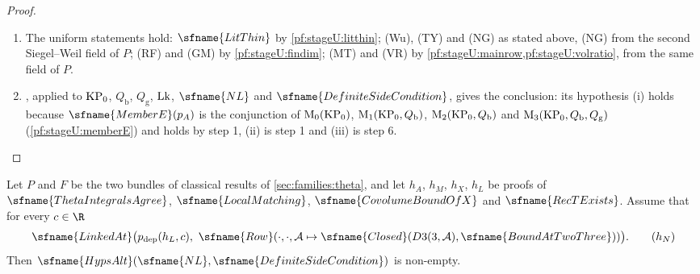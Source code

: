 \begin{proof}
\begin{enumerate}[label=\arabic*.]
linked for the covolume, functional and norm rows of $\stageUNN$ satisfies
$\sfname{AllRowsAlt}(\stageUKP_0,Q_{\mathrm b},Q_{\mathrm g},\stageULk,\stageUNN,\sfname{DefiniteSideCondition})$), applied with
the fields of $P$, steps 3 and 5 and the hypotheses (ii), (iii), the row package
$\sfname{AllRowsAlt}(\stageUKP_0,Q_{\mathrm b},Q_{\mathrm g},\stageULk,\sfname{NL},\sfname{DefiniteSideCondition})$ holds.
\item The uniform statements hold: $\sfname{LitThin}$ by \cref{pf:stageU:litthin}; (Wu), (TY) and (NG) as stated above, (NG)
from the second Siegel--Weil field of $P$; (RF) and (GM) by \cref{pf:stageU:findim}; (MT) and (VR) by
\cref{pf:stageU:mainrow,pf:stageU:volratio}, from the same field of $P$.
\item {}, applied to $\mathrm{KP}_0$, $Q_{\mathrm b}$, $Q_{\mathrm g}$, $\mathrm{Lk}$, $\sfname{NL}$ and
$\sfname{DefiniteSideCondition}$, gives the conclusion: its hypothesis (i) holds because $\sfname{MemberE}(\stageUpA)$ is the
conjunction of $\mathrm{M}_0(\mathrm{KP}_0)$, $\mathrm{M}_1(\mathrm{KP}_0,Q_{\mathrm b})$, $\mathrm{M}_2(\mathrm{KP}_0,Q_{\mathrm b})$
and $\mathrm{M}_3(\mathrm{KP}_0,Q_{\mathrm b},Q_{\mathrm g})$ (\cref{pf:stageU:memberE}) and holds by step 1, (ii) is step 1 and
(iii) is step 6.\qedhere
\end{enumerate}
\end{proof}

\begin{theorem}\label{pf:stageU:main}
Let $P$ and $F$ be the two bundles of classical results of \cref{sec:families:theta}, and let $h_A$, $h_M$, $h_X$, $h_L$ be
proofs of $\sfname{ThetaIntegralsAgree}$, $\sfname{LocalMatching}$, $\sfname{CovolumeBoundOfX}$ and $\sfname{RecTExists}$.
Assume that for every $c\in\R$
\[
\sfname{LinkedAt}\bigl(\stageUpd(h_L,c),\ \sfname{Row}(\cdot,\cdot,\stageUA\mapsto
\sfname{Closed}(D3(3,\stageUA),\sfname{BoundAtTwoThree}))\bigr).\tag{$h_N$}
\]
Then $\sfname{HypsAlt}(\sfname{NL},\sfname{DefiniteSideCondition})$ is non-empty.
\end{theorem}


